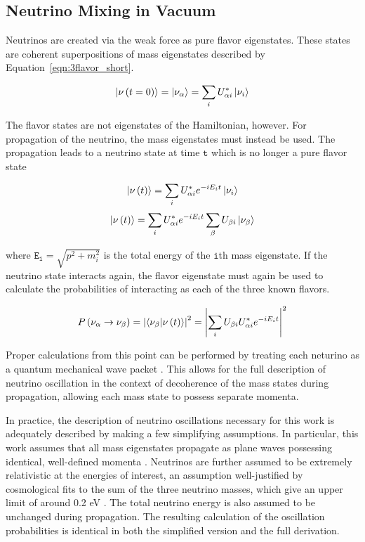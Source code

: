 \label{subsec:vacuum}
\subsection{Neutrino Mixing in Vacuum}
Neutrinos are created via the weak force as pure flavor eigenstates. 
These states are coherent superpositions of mass eigenstates described by Equation~\ref{eqn:3flavor_short}.

\begin{equation}
\ket{\nu\left(t=0\right)} = \ket{\nu_\alpha} = \sum_i U_{\alpha i}^* \ket{\nu_i}
\end{equation}

The flavor states are not eigenstates of the Hamiltonian, however.
For propagation of the neutrino, the mass eigenstates must instead be used.
The propagation leads to a neutrino state at time $\mathtt{t}$ which is no longer a pure flavor state

\begin{equation}
\ket{\nu\left(t\right)} = \sum_i U^*_{\alpha i} e^{-iE_i t} \ket{\nu_i}
\end{equation}
\begin{equation}
\ket{\nu\left(t\right)} = \sum_i U^*_{\alpha i} e^{-iE_i t} \sum_{\beta} U_{\beta i} \ket{\nu_\beta}
\end{equation}

where $\mathtt{E_i} = \sqrt{p^2+m_i^2}$ is the total energy of the $\mathtt{i}$th mass eigenstate.
If the neutrino state interacts again, the flavor eigenstate must again be used to calculate the probabilities of interacting as each of the three known flavors.

\begin{equation}
P\left(\nu_\alpha\rightarrow\nu_\beta\right) = \left|\bra{\nu_\beta}\ket{\nu\left(t\right)}\right|^2 
                 															= \left|\sum_i U_{\beta i} U^*_{\alpha i} e^{-i E_i t} \right|^2
\label{eqn:pmns_probability}
\end{equation}

Proper calculations from this point can be performed by treating each neturino as a quantum mechanical wave packet \cite{OscillationWavePackets}.
This allows for the full description of neutrino oscillation in the context of decoherence of the mass states during propagation, allowing each mass state to possess separate momenta.

In practice, the description of neutrino oscillations necessary for this work is adequately described by making a few simplifying assumptions.
In particular, this work assumes that all mass eigenstates propagate as plane waves possessing identical, well-defined momenta \cite{Review-PMNS}.
Neutrinos are further assumed to be extremely relativistic at the energies of interest, an assumption well-justified by cosmological fits to the sum of the three neutrino masses, which give an upper limit of around 0.2 eV \cite{PDG-2015}.
The total neutrino energy is also assumed to be unchanged during propagation.
The resulting calculation of the oscillation probabilities is identical in both the simplified version and the full derivation.

